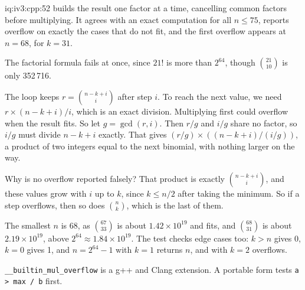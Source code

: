 \begin{solution}{iq:iv3:cpp:52}
 builds the result one factor at a time, cancelling common factors before multiplying. It agrees with an exact computation for all $n \le 75$, reports overflow on exactly the cases that do not fit, and the first overflow appears at $n = 68$, for $k = 31$.
\label{lst:iv3:cp:choose}

The factorial formula fails at once, since $21!$ is more than $2^{64}$, though $\binom{21}{10}$ is only 352\,716.

The loop keeps $r = \binom{n - k + i}{i}$ after step $i$. To reach the next value, we need $r \times (n - k + i) / i$, which is an exact division. Multiplying first could overflow when the result fits. So let $g = \gcd(r, i)$. Then $r / g$ and $i / g$ share no factor, so $i / g$ must divide $n - k + i$ exactly. That gives $(r / g) \times ((n - k + i) / (i / g))$, a product of two integers equal to the next binomial, with nothing larger on the way.

Why is no overflow reported falsely? That product is exactly $\binom{n - k + i}{i}$, and these values grow with $i$ up to $k$, since $k \le n / 2$ after taking the minimum. So if a step overflows, then so does $\binom{n}{k}$, which is the last of them.

The smallest $n$ is 68, as $\binom{67}{33}$ is about $1.42 \times 10^{19}$ and fits, and $\binom{68}{31}$ is about $2.19 \times 10^{19}$, above $2^{64} \approx 1.84 \times 10^{19}$. The test checks edge cases too: $k > n$ gives 0, $k = 0$ gives 1, and $n = 2^{64} - 1$ with $k = 1$ returns $n$, and with $k = 2$ overflows.

\texttt{\_\_builtin\_mul\_overflow} is a g++ and Clang extension. A portable form tests \texttt{a > max / b} first.

\end{solution}

